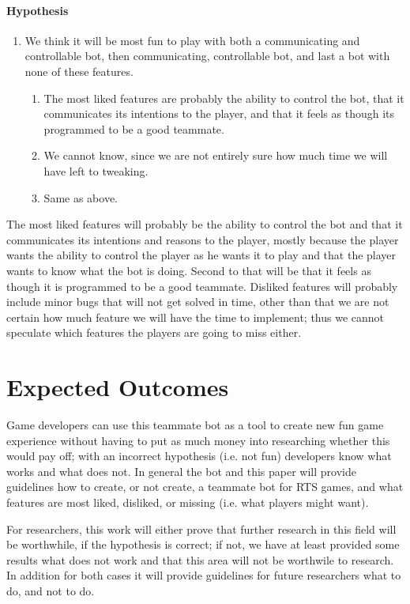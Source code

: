 \paragraph{Hypothesis}
\begin{enumerate}
	\item We think it will be most fun to play with both a communicating and controllable bot, then communicating, controllable bot, and last a bot with none of these features.
	\begin{enumerate}
		\item The most liked features are probably the ability to control the bot, that it communicates its intentions to the player, and that it feels as though its programmed to be a good teammate.
		\item We cannot know, since we are not entirely sure how much time we will have left to tweaking.
		\item Same as above.
	\end{enumerate}
\end{enumerate}

The most liked features will probably be the ability to control the bot and that it communicates its intentions and reasons to the player, mostly because the player wants the ability to control the player as he wants it to play and that the player wants to know what the bot is doing. Second to that will be that it feels as though it is programmed to be a good teammate. Disliked features will probably include minor bugs that will not get solved in time, other than that we are not certain how much feature we will have the time to implement; thus we cannot speculate which features the players are going to miss either.

\section{Expected Outcomes}
Game developers can use this teammate bot as a tool to create new fun game experience without having to put as much money into researching whether this would pay off; with an incorrect hypothesis (i.e. not fun) developers know what works and what does not. In general the bot and this paper will provide guidelines how to create, or not create, a teammate bot for RTS games, and what features are most liked, disliked, or missing (i.e. what players might want).

For researchers, this work will either prove that further research in this field will be worthwhile, if the hypothesis is correct; if not, we have at least provided some results what does not work and that this area will not be worthwile to research. In addition for both cases it will provide guidelines for future researchers what to do, and not to do.